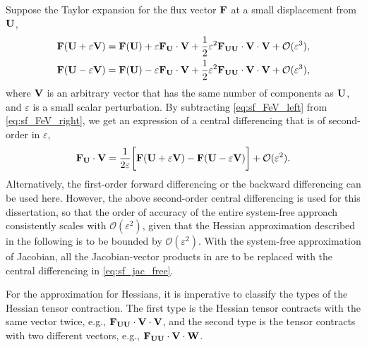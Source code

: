 Suppose the Taylor expansion for the flux vector \( \mathbf{F} \) at a small displacement from \( \mathbf{U} \),
\begin{subequations}\label{eq:sf_FeV}
    \begin{align}
        \label{eq:sf_FeV_right}\mathbf{F} ( \mathbf{U} + \varepsilon \mathbf{V}) =
        \mathbf{F}(\mathbf{U}) + \varepsilon \mathbf{F}_{\mathbf{U}} \cdot \mathbf{V} +
        \frac{1}{2} \varepsilon^{2} \mathbf{F}_{\mathbf{U}\mathbf{U}} \cdot \mathbf{V} \cdot \mathbf{V} + \mathcal{O}(\varepsilon^{3}), \\
        \label{eq:sf_FeV_left}\mathbf{F} ( \mathbf{U} - \varepsilon \mathbf{V}) =
        \mathbf{F}(\mathbf{U}) - \varepsilon \mathbf{F}_{\mathbf{U}} \cdot \mathbf{V} +
        \frac{1}{2} \varepsilon^{2} \mathbf{F}_{\mathbf{U}\mathbf{U}} \cdot \mathbf{V} \cdot \mathbf{V} + \mathcal{O}(\varepsilon^{3}),
    \end{align}
\end{subequations}
where \( \mathbf{V} \) is an arbitrary vector that has
the same number of components as \( \mathbf{U} \), and \( \varepsilon \) is a
small scalar perturbation.
By subtracting \cref{eq:sf_FeV_left} from \cref{eq:sf_FeV_right},
we get an expression of a central differencing that is of second-order in $\varepsilon$,
\begin{equation}\label{eq:sf_jac_free}
    \mathbf{F}_{\mathbf{U}} \cdot \mathbf{V} = \frac{1}{2\varepsilon}
    \bigg[ \mathbf{F}(\mathbf{U} + \varepsilon \mathbf{V}) -\mathbf{F}(\mathbf{U} - \varepsilon \mathbf{V}) \bigg]
    + \mathcal{O} ( \varepsilon^{2} ).
\end{equation}
Alternatively, the first-order forward differencing or the backward differencing can be used here.
However, the above second-order central differencing is used for this dissertation,
so that the order of accuracy of the entire system-free approach consistently scales with \( \mathcal{O}(\varepsilon^{2}) \),
given that the Hessian approximation described in the following is to be bounded by \( \mathcal{O}(\varepsilon^{2}) \).
With the system-free approximation of Jacobian, all the Jacobian-vector products in 
are to be replaced with the central differencing in \cref{eq:sf_jac_free}.

For the approximation for Hessians, it is imperative to classify
the types of the Hessian tensor contraction.
The first type is the Hessian tensor contracts with the same vector twice, e.g., \( \mathbf{F}_{\mathbf{U}\mathbf{U}} \cdot \mathbf{V} \cdot \mathbf{V} \),
and the second type is the tensor contracts with
two different vectors, e.g., \( \mathbf{F}_{\mathbf{U}\mathbf{U}} \cdot \mathbf{V} \cdot \mathbf{W} \).

